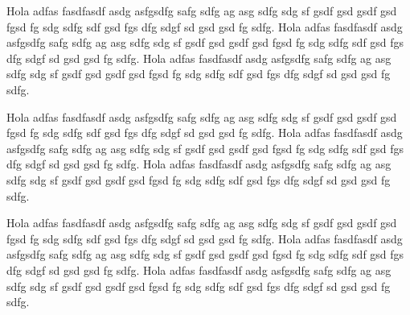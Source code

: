 \documentclass[compacto,10pt,comentarios]{aleph-notas}
\begin{document}
\begin{comentarios}
    Hola adfas fasdfasdf asdg asfgsdfg safg sdfg ag asg sdfg sdg sf gsdf gsd gsdf gsd fgsd fg sdg sdfg sdf gsd fgs dfg sdgf sd gsd gsd fg sdfg. Hola adfas fasdfasdf asdg asfgsdfg safg sdfg ag asg sdfg sdg sf gsdf gsd gsdf gsd fgsd fg sdg sdfg sdf gsd fgs dfg sdgf sd gsd gsd fg sdfg. Hola adfas fasdfasdf asdg asfgsdfg safg sdfg ag asg sdfg sdg sf gsdf gsd gsdf gsd fgsd fg sdg sdfg sdf gsd fgs dfg sdgf sd gsd gsd fg sdfg.
    
    Hola adfas fasdfasdf asdg asfgsdfg safg sdfg ag asg sdfg sdg sf gsdf gsd gsdf gsd fgsd fg sdg sdfg sdf gsd fgs dfg sdgf sd gsd gsd fg sdfg. Hola adfas fasdfasdf asdg asfgsdfg safg sdfg ag asg sdfg sdg sf gsdf gsd gsdf gsd fgsd fg sdg sdfg sdf gsd fgs dfg sdgf sd gsd gsd fg sdfg. Hola adfas fasdfasdf asdg asfgsdfg safg sdfg ag asg sdfg sdg sf gsdf gsd gsdf gsd fgsd fg sdg sdfg sdf gsd fgs dfg sdgf sd gsd gsd fg sdfg.
    
    Hola adfas fasdfasdf asdg asfgsdfg safg sdfg ag asg sdfg sdg sf gsdf gsd gsdf gsd fgsd fg sdg sdfg sdf gsd fgs dfg sdgf sd gsd gsd fg sdfg. Hola adfas fasdfasdf asdg asfgsdfg safg sdfg ag asg sdfg sdg sf gsdf gsd gsdf gsd fgsd fg sdg sdfg sdf gsd fgs dfg sdgf sd gsd gsd fg sdfg. Hola adfas fasdfasdf asdg asfgsdfg safg sdfg ag asg sdfg sdg sf gsdf gsd gsdf gsd fgsd fg sdg sdfg sdf gsd fgs dfg sdgf sd gsd gsd fg sdfg.
\end{comentarios}
\end{document}
